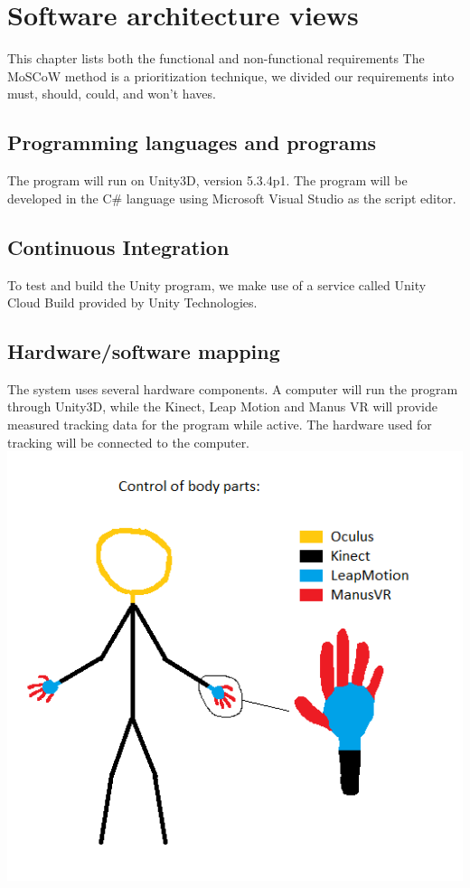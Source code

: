 \documentclass[11pt,a4paper]{report}
\begin{document}
\chapter{ Software architecture views}
This chapter lists both the functional and non-functional requirements
The MoSCoW method is a prioritization technique, we divided our requirements into must, should, could, and won't haves. 
\section{Programming languages and programs}
The program will run on Unity3D, version 5.3.4p1. The program will be developed in the C\#
language using Microsoft Visual Studio as the script editor.
\section{Continuous Integration}
To test and build the Unity program, we make use of a service called Unity Cloud Build
provided by Unity Technologies.
\section{Hardware/software mapping}
The system uses several hardware components. A computer will run the program through
Unity3D, while the Kinect, Leap Motion and Manus VR will provide measured tracking data
for the program while active. The hardware used for tracking will be connected to the
computer.
\includegraphics[scale=0.7]{control_of_bodyparts.png}
\end{document}
